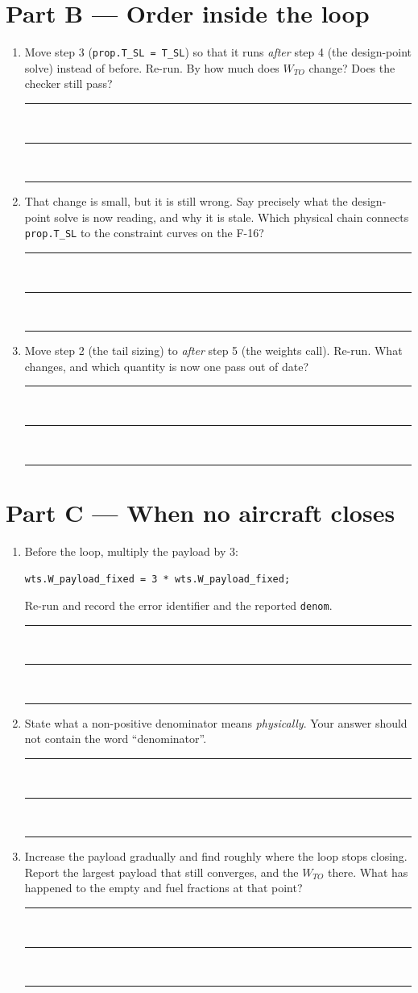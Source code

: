 \documentclass[11pt, a4paper]{article}
\newcommand{\answerspace}[1]{\vspace{#1}\noindent\rule{\linewidth}{0.3pt}\\[2mm]
  \noindent\rule{\linewidth}{0.3pt}\\[2mm]\noindent\rule{\linewidth}{0.3pt}\vspace{3mm}}
\begin{document}
\section*{Part B --- Order inside the loop}

\begin{enumerate}[leftmargin=*, itemsep=3mm, resume]

\item Move step 3 (\texttt{prop.T\_SL = T\_SL}) so that it runs \emph{after}
step 4 (the design-point solve) instead of before. Re-run. By how much does
$W_{TO}$ change? Does the checker still pass?
\answerspace{6mm}

\item That change is small, but it is still wrong. Say precisely what the
design-point solve is now reading, and why it is stale. Which physical chain
connects \texttt{prop.T\_SL} to the constraint curves on the F-16?
\answerspace{12mm}

\item Move step 2 (the tail sizing) to \emph{after} step 5 (the weights call).
Re-run. What changes, and which quantity is now one pass out of date?
\answerspace{8mm}

\end{enumerate}

\section*{Part C --- When no aircraft closes}

\begin{enumerate}[leftmargin=*, itemsep=3mm, resume]

\item Before the loop, multiply the payload by 3:
\begin{center}
\texttt{wts.W\_payload\_fixed = 3 * wts.W\_payload\_fixed;}
\end{center}
Re-run and record the error identifier and the reported \texttt{denom}.
\answerspace{6mm}

\item State what a non-positive denominator means \emph{physically}. Your
answer should not contain the word ``denominator''.
\answerspace{12mm}

\item Increase the payload gradually and find roughly where the loop stops
closing. Report the largest payload that still converges, and the $W_{TO}$
there. What has happened to the empty and fuel fractions at that point?
\answerspace{10mm}

\end{enumerate}
\end{document}
